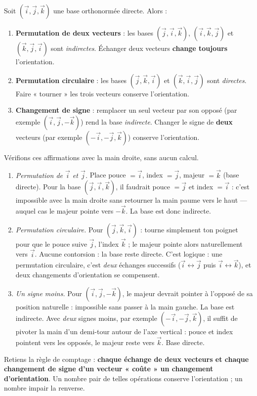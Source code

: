 \documentclass[11pt]{article}
\begin{document}
\begin{propriete}
Soit $(\vec{i},\vec{j},\vec{k})$ une base orthonormée directe. Alors :
\begin{enumerate}
\item \textbf{Permutation de deux vecteurs} : les bases $(\vec{j},\vec{i},\vec{k})$, $(\vec{i},\vec{k},\vec{j})$ et $(\vec{k},\vec{j},\vec{i})$ sont \emph{indirectes}. Échanger deux vecteurs \textbf{change toujours} l'orientation.
\item \textbf{Permutation circulaire} : les bases $(\vec{j},\vec{k},\vec{i})$ et $(\vec{k},\vec{i},\vec{j})$ sont \emph{directes}. Faire « tourner » les trois vecteurs conserve l'orientation.
\item \textbf{Changement de signe} : remplacer un seul vecteur par son opposé (par exemple $(\vec{i},\vec{j},-\vec{k})$) rend la base \emph{indirecte}. Changer le signe de \textbf{deux} vecteurs (par exemple $(-\vec{i},-\vec{j},\vec{k})$) conserve l'orientation.
\end{enumerate}
\end{propriete}

\begin{experience}
Vérifions ces affirmations avec la main droite, sans aucun calcul.
\begin{enumerate}
\item \emph{Permutation de $\vec{i}$ et $\vec{j}$.} Place pouce $=\vec{i}$, index $=\vec{j}$, majeur $=\vec{k}$ (base directe). Pour la base $(\vec{j},\vec{i},\vec{k})$, il faudrait pouce $=\vec{j}$ et index $=\vec{i}$ : c'est impossible avec la main droite sans retourner la main paume vers le haut — auquel cas le majeur pointe vers $-\vec{k}$. La base est donc indirecte.
\item \emph{Permutation circulaire.} Pour $(\vec{j},\vec{k},\vec{i})$ : tourne simplement ton poignet pour que le pouce suive $\vec{j}$, l'index $\vec{k}$ ; le majeur pointe alors naturellement vers $\vec{i}$. Aucune contorsion : la base reste directe. C'est logique : une permutation circulaire, c'est \emph{deux} échanges successifs ($\vec{i}\leftrightarrow\vec{j}$ puis $\vec{i}\leftrightarrow\vec{k}$), et deux changements d'orientation se compensent.
\item \emph{Un signe moins.} Pour $(\vec{i},\vec{j},-\vec{k})$, le majeur devrait pointer à l'opposé de sa position naturelle : impossible sans passer à la main gauche. La base est indirecte. Avec \emph{deux} signes moins, par exemple $(-\vec{i},-\vec{j},\vec{k})$, il suffit de pivoter la main d'un demi-tour autour de l'axe vertical : pouce et index pointent vers les opposés, le majeur reste vers $\vec{k}$. Base directe.
\end{enumerate}
Retiens la règle de comptage : \textbf{chaque échange de deux vecteurs et chaque changement de signe d'un vecteur « coûte » un changement d'orientation}. Un nombre pair de telles opérations conserve l'orientation ; un nombre impair la renverse.
\end{experience}
\end{document}
